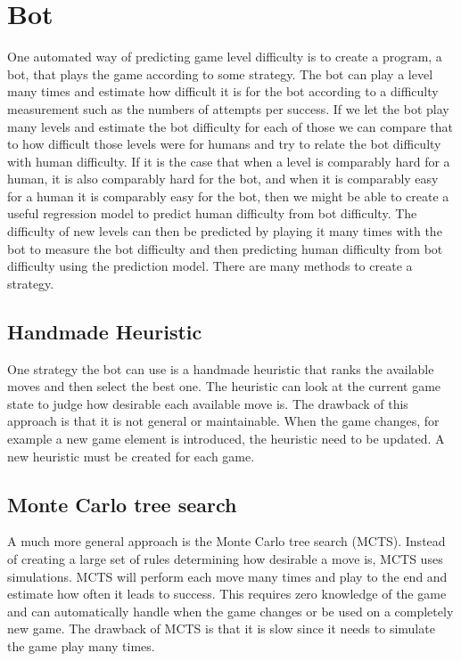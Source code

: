 \documentclass{kththesis}
\begin{document}
\section{Bot}
One automated way of predicting game level difficulty is to create a program, a bot, that plays the game according to some strategy. The bot can play a level many times and estimate how difficult it is for the bot according to a difficulty measurement such as the numbers of attempts per success. If we let the bot play many levels and estimate the bot difficulty for each of those we can compare that to how difficult those levels were for humans and try to relate the bot difficulty with human difficulty.  If it is the case that when a level is comparably hard for a human, it is also comparably hard for the bot, and when it is comparably easy for a human it is comparably easy for the bot, then we might be able to create a useful regression model to predict human difficulty from bot difficulty. The difficulty of new levels can then be predicted by playing it many times with the bot to measure the bot difficulty and then predicting human difficulty from bot difficulty using the prediction model. There are many methods to create a strategy.

\subsection{Handmade Heuristic}
One strategy the bot can use is a handmade heuristic that ranks the available moves and then select the best one. The heuristic can look at the current game state to judge how desirable each available move is. The drawback of this approach is that it is not general or maintainable. When the game changes, for example a new game element is introduced, the heuristic need to be updated. A new heuristic must be created for each game.

\subsection{Monte Carlo tree search}
A much more general approach is the Monte Carlo tree search (MCTS). Instead of creating a large set of rules determining how desirable a move is, MCTS uses simulations. MCTS will perform each move many times and play to the end and estimate how often it leads to success. This requires zero knowledge of the game and can automatically handle when the game changes or be used on a completely new game. The drawback of MCTS is that it is slow since it needs to simulate the game play many times.
\end{document}

